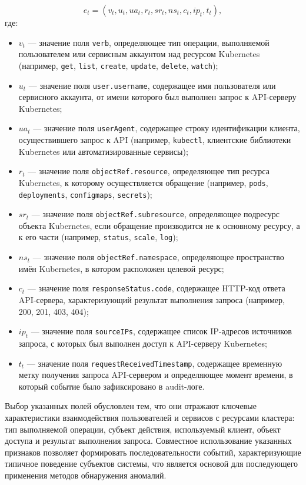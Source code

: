 \begin{equation}\label{eq:event_structure}
    e_t = (v_t, u_t, ua_t, r_t, sr_t, ns_t, c_t, ip_t, t_t),
\end{equation}
где:
\begin{itemize}
    \item $v_t$ — значение поля \texttt{verb}, определяющее тип операции, выполняемой пользователем или сервисным аккаунтом над ресурсом Kubernetes (например, \texttt{get}, \texttt{list}, \texttt{create}, \texttt{update}, \texttt{delete}, \texttt{watch});
    \item $u_t$ — значение поля \texttt{user.username}, содержащее имя пользователя или сервисного аккаунта, от имени которого был выполнен запрос к API-серверу Kubernetes;
    \item $ua_t$ — значение поля \texttt{userAgent}, содержащее строку идентификации клиента, осуществившего запрос к API (например, \texttt{kubectl}, клиентские библиотеки Kubernetes или автоматизированные сервисы);
    \item $r_t$ — значение поля \texttt{objectRef.resource}, определяющее тип ресурса Kubernetes, к которому осуществляется обращение (например, \texttt{pods}, \texttt{deployments}, \texttt{configmaps}, \texttt{secrets});
    \item $sr_t$ — значение поля \texttt{objectRef.subresource}, определяющее подресурс объекта Kubernetes, если обращение производится не к основному ресурсу, а к его части (например, \texttt{status}, \texttt{scale}, \texttt{log});
    \item $ns_t$ — значение поля \texttt{objectRef.namespace}, определяющее пространство имён Kubernetes, в котором расположен целевой ресурс;
    \item $c_t$ — значение поля \texttt{responseStatus.code}, содержащее HTTP-код ответа API-сервера, характеризующий результат выполнения запроса (например, 200, 201, 403, 404);
    \item $ip_t$ — значение поля \texttt{sourceIPs}, содержащее список IP-адресов источников запроса, с которых был выполнен доступ к API-серверу Kubernetes;
    \item $t_t$ — значение поля \texttt{requestReceivedTimestamp}, содержащее временную метку получения запроса API-сервером и определяющее момент времени, в который событие было зафиксировано в audit-логе.
\end{itemize}

Выбор указанных полей обусловлен тем, что они отражают ключевые характеристики взаимодействия пользователей и сервисов с ресурсами кластера: тип выполняемой операции, субъект действия, используемый клиент, объект доступа и результат выполнения запроса. Совместное использование указанных признаков позволяет формировать последовательности событий, характеризующие типичное поведение субъектов системы, что является основой для последующего применения методов обнаружения аномалий.

